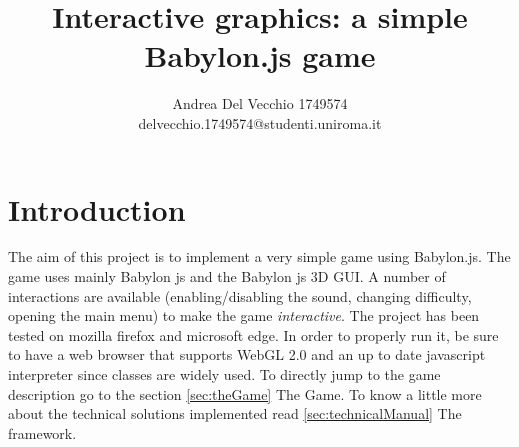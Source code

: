 \documentclass[14pt]{article}
\title{\textbf{Interactive graphics: a simple Babylon.js game}}
\author{Andrea Del Vecchio 1749574\\
		delvecchio.1749574@studenti.uniroma.it}
\date{}
\begin{document}
\maketitle
\section{Introduction}
The aim of this project is to implement a very simple game using Babylon.js. The game uses mainly Babylon js and the Babylon js 3D GUI. A number of interactions are available (enabling/disabling the sound, changing difficulty, opening the main menu) to make the game \textit{interactive}. The project has been tested on mozilla firefox and microsoft edge. In order to properly run it, be sure to have a web browser that supports WebGL 2.0 and an up to date javascript interpreter since classes are widely used. To directly jump to the game description go to the section \ref{sec:theGame} The Game. To know a little more about the technical solutions implemented read \ref{sec:technicalManual} The framework.
\end{document}
